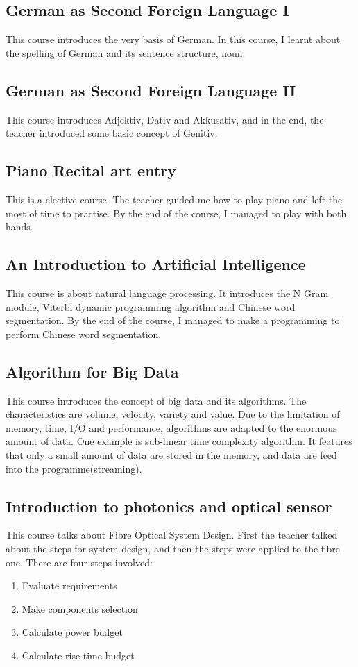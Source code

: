\subsection{German as Second Foreign Language I}
This course introduces the very basis of German. In this course, I learnt about the spelling of German and its sentence structure, noun.

\subsection{German as Second Foreign Language II}
This course introduces Adjektiv, Dativ and Akkusativ, and in the end, the teacher introduced some basic concept of Genitiv.

\subsection{Piano Recital art entry}
This is a elective course. The teacher guided me how to play piano and left the most of time to practise. By the end of the course, I managed to play with both hands.

\subsection{An Introduction to Artificial Intelligence}
This course is about natural language processing. It introduces the N Gram module, Viterbi dynamic programming algorithm and Chinese word segmentation. By the end of the course, I managed to make a programming to perform Chinese word segmentation.

\subsection{Algorithm for Big Data}
This course introduces the concept of big data and its algorithms. The characteristics are volume, velocity, variety and value. Due to the limitation of memory, time, I/O and performance, algorithms are adapted to the enormous amount of data. One example is sub-linear time complexity algorithm. It features that only a small amount of data are stored in the memory, and data are feed into the programme(streaming).

\subsection{Introduction to photonics and optical sensor}
This course talks about Fibre Optical System Design. First the teacher talked about the steps for system design, and then the steps were applied to the fibre one. There are four steps involved:
\begin{enumerate}
  \item Evaluate requirements
  \item Make components selection
  \item Calculate power budget
  \item Calculate rise time budget
\end{enumerate}

